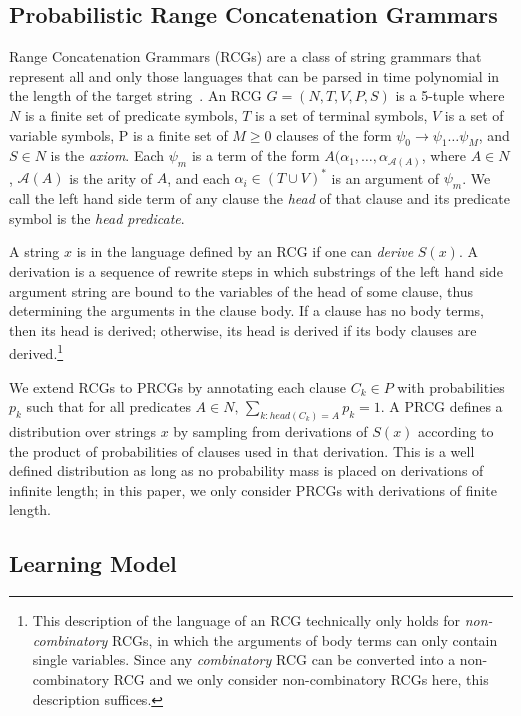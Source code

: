 \documentclass{article} %
\begin{document}
\subsection{Probabilistic Range Concatenation Grammars}
Range Concatenation Grammars (RCGs) are a class of string grammars
that represent all and only those languages that can be parsed in time
polynomial in the length of the target
string~\cite{boullier2005range}. An RCG $G=(N, T, V, P, S)$ is a
5-tuple where $N$ is a finite set of predicate symbols, $T$ is a set
of terminal symbols, $V$ is a set of variable symbols, P is a finite
set of $M \geq 0$ clauses of the form $\psi_0 \rightarrow \psi_1 \dots
\psi_M$, and $S \in N$ is the \emph{axiom}. Each $\psi_m$ is a term of
the form $A(\alpha_1, \dots, \alpha_{\mathcal{A}(A)}$, where $A \in
N$, $\mathcal{A}(A)$ is the arity of $A$, and each $\alpha_i \in (T
\cup V)^*$ is an argument of $\psi_m$. We call the left hand side term
of any clause the \emph{head} of that clause and its predicate symbol
is the \emph{head predicate}.

A string $x$ is in the language defined by an RCG if one can
\emph{derive} $S(x)$. A derivation is a sequence of rewrite steps in
which substrings of the left hand side argument string are bound to
the variables of the head of some clause, thus determining the
arguments in the clause body. If a clause has no body terms, then its
head is derived; otherwise, its head is derived if its body clauses
are derived.\footnote{This description of the language of an RCG
  technically only holds for \emph{non-combinatory} RCGs, in which the
  arguments of body terms can only contain single variables. Since any
  \emph{combinatory} RCG can be converted into a non-combinatory RCG
  and we only consider non-combinatory RCGs here, this description
  suffices.}

We extend RCGs to PRCGs by annotating each clause $C_k \in P$ with
probabilities $p_k$ such that for all predicates ${A \in N, \,
  \sum_{k:head(C_k)=A} p_k = 1}$. A PRCG defines a distribution over
strings $x$ by sampling from derivations of $S(x)$ according to the
product of probabilities of clauses used in that derivation. This is a
well defined distribution as long as no probability mass is placed on
derivations of infinite length; in this paper, we only consider PRCGs
with derivations of finite length.

\subsection{Learning Model}
\end{document}
